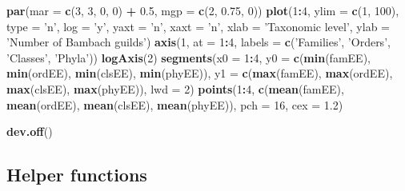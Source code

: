 \documentclass[]{article}
\newenvironment{Shaded}{\begin{snugshade}}{\end{snugshade}}
\newcommand{\KeywordTok}[1]{\textcolor[rgb]{0.13,0.29,0.53}{\textbf{#1}}}
\newcommand{\DataTypeTok}[1]{\textcolor[rgb]{0.13,0.29,0.53}{#1}}
\newcommand{\DecValTok}[1]{\textcolor[rgb]{0.00,0.00,0.81}{#1}}
\newcommand{\FloatTok}[1]{\textcolor[rgb]{0.00,0.00,0.81}{#1}}
\newcommand{\StringTok}[1]{\textcolor[rgb]{0.31,0.60,0.02}{#1}}
\newcommand{\OperatorTok}[1]{\textcolor[rgb]{0.81,0.36,0.00}{\textbf{#1}}}
\newcommand{\NormalTok}[1]{#1}
\begin{document}
\begin{Shaded}
\begin{Highlighting}[]
\KeywordTok{par}\NormalTok{(}\DataTypeTok{mar =} \KeywordTok{c}\NormalTok{(}\DecValTok{3}\NormalTok{, }\DecValTok{3}\NormalTok{, }\DecValTok{0}\NormalTok{, }\DecValTok{0}\NormalTok{) }\OperatorTok{+}\StringTok{ }\FloatTok{0.5}\NormalTok{, }\DataTypeTok{mgp =} \KeywordTok{c}\NormalTok{(}\DecValTok{2}\NormalTok{, }\FloatTok{0.75}\NormalTok{, }\DecValTok{0}\NormalTok{))}
\KeywordTok{plot}\NormalTok{(}\DecValTok{1}\OperatorTok{:}\DecValTok{4}\NormalTok{, }\DataTypeTok{ylim =} \KeywordTok{c}\NormalTok{(}\DecValTok{1}\NormalTok{, }\DecValTok{100}\NormalTok{), }\DataTypeTok{type =} \StringTok{'n'}\NormalTok{, }\DataTypeTok{log =} \StringTok{'y'}\NormalTok{, }\DataTypeTok{yaxt =} \StringTok{'n'}\NormalTok{, }\DataTypeTok{xaxt =} \StringTok{'n'}\NormalTok{,}
     \DataTypeTok{xlab =} \StringTok{'Taxonomic level'}\NormalTok{, }\DataTypeTok{ylab =} \StringTok{'Number of Bambach guilds'}\NormalTok{)}
\KeywordTok{axis}\NormalTok{(}\DecValTok{1}\NormalTok{, }\DataTypeTok{at =} \DecValTok{1}\OperatorTok{:}\DecValTok{4}\NormalTok{, }\DataTypeTok{labels =} \KeywordTok{c}\NormalTok{(}\StringTok{'Families'}\NormalTok{, }\StringTok{'Orders'}\NormalTok{, }\StringTok{'Classes'}\NormalTok{, }\StringTok{'Phyla'}\NormalTok{))}
\KeywordTok{logAxis}\NormalTok{(}\DecValTok{2}\NormalTok{)}
\KeywordTok{segments}\NormalTok{(}\DataTypeTok{x0 =} \DecValTok{1}\OperatorTok{:}\DecValTok{4}\NormalTok{, }\DataTypeTok{y0 =} \KeywordTok{c}\NormalTok{(}\KeywordTok{min}\NormalTok{(famEE), }\KeywordTok{min}\NormalTok{(ordEE), }\KeywordTok{min}\NormalTok{(clsEE), }\KeywordTok{min}\NormalTok{(phyEE)), }
         \DataTypeTok{y1 =} \KeywordTok{c}\NormalTok{(}\KeywordTok{max}\NormalTok{(famEE), }\KeywordTok{max}\NormalTok{(ordEE), }\KeywordTok{max}\NormalTok{(clsEE), }\KeywordTok{max}\NormalTok{(phyEE)), }\DataTypeTok{lwd =} \DecValTok{2}\NormalTok{)}
\KeywordTok{points}\NormalTok{(}\DecValTok{1}\OperatorTok{:}\DecValTok{4}\NormalTok{, }\KeywordTok{c}\NormalTok{(}\KeywordTok{mean}\NormalTok{(famEE), }\KeywordTok{mean}\NormalTok{(ordEE), }\KeywordTok{mean}\NormalTok{(clsEE), }\KeywordTok{mean}\NormalTok{(phyEE)), }\DataTypeTok{pch =} \DecValTok{16}\NormalTok{, }\DataTypeTok{cex =} \FloatTok{1.2}\NormalTok{)}

\KeywordTok{dev.off}\NormalTok{()}
\end{Highlighting}
\end{Shaded}

\subsection{Helper functions}\label{helper-functions}
\end{document}
